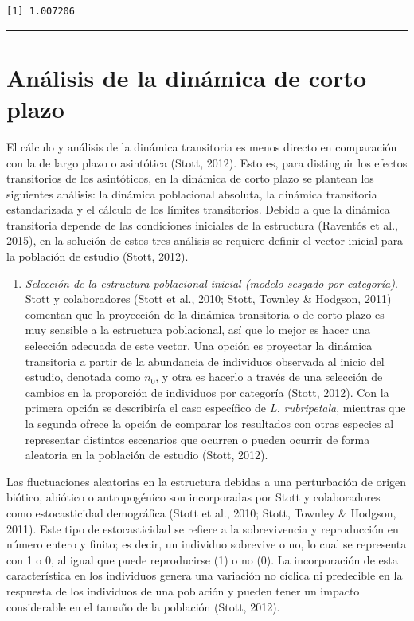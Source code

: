 \documentclass[
  12pt,
  letterpaper,
]{book}
\providecommand{\tightlist}{%
  \setlength{\itemsep}{0pt}\setlength{\parskip}{0pt}}\usepackage{longtable,booktabs,array}
\begin{document}
\begin{verbatim}
[1] 1.007206
\end{verbatim}

\begin{center}\rule{0.5\linewidth}{0.5pt}\end{center}

\section{Análisis de la dinámica de corto
plazo}\label{anuxe1lisis-de-la-dinuxe1mica-de-corto-plazo}

El cálculo y análisis de la dinámica transitoria es menos directo en
comparación con la de largo plazo o asintótica (Stott, 2012). Esto es,
para distinguir los efectos transitorios de los asintóticos, en la
dinámica de corto plazo se plantean los siguientes análisis: la dinámica
poblacional absoluta, la dinámica transitoria estandarizada y el cálculo
de los límites transitorios. Debido a que la dinámica transitoria
depende de las condiciones iniciales de la estructura (Raventós et al.,
2015), en la solución de estos tres análisis se requiere definir el
vector inicial para la población de estudio (Stott, 2012).

\begin{enumerate}
\def\labelenumi{\alph{enumi})}
\tightlist
\item
  \emph{Selección de la estructura poblacional inicial (modelo sesgado
  por categoría)}. Stott y colaboradores (Stott et al., 2010; Stott,
  Townley \& Hodgson, 2011) comentan que la proyección de la dinámica
  transitoria o de corto plazo es muy sensible a la estructura
  poblacional, así que lo mejor es hacer una selección adecuada de este
  vector. Una opción es proyectar la dinámica transitoria a partir de la
  abundancia de individuos observada al inicio del estudio, denotada
  como \(n_{0}\), y otra es hacerlo a través de una selección de cambios
  en la proporción de individuos por categoría (Stott, 2012). Con la
  primera opción se describiría el caso específico de \emph{L.
  rubripetala}, mientras que la segunda ofrece la opción de comparar los
  resultados con otras especies al representar distintos escenarios que
  ocurren o pueden ocurrir de forma aleatoria en la población de estudio
  (Stott, 2012).
\end{enumerate}

Las fluctuaciones aleatorias en la estructura debidas a una perturbación
de origen biótico, abiótico o antropogénico son incorporadas por Stott y
colaboradores como estocasticidad demográfica (Stott et al., 2010;
Stott, Townley \& Hodgson, 2011). Este tipo de estocasticidad se refiere
a la sobrevivencia y reproducción en número entero y finito; es decir,
un individuo sobrevive o no, lo cual se representa con 1 o 0, al igual
que puede reproducirse (1) o no (0). La incorporación de esta
característica en los individuos genera una variación no cíclica ni
predecible en la respuesta de los individuos de una población y pueden
tener un impacto considerable en el tamaño de la población (Stott,
2012).
\end{document}
